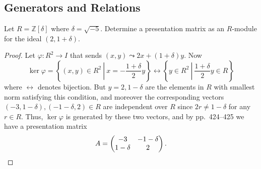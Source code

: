 \documentclass[12pt]{article}
\theoremstyle{remark}
\begin{document}
\subsection{Generators and Relations}
\begin{problem}
  Let $R = \mathbb{Z}[\delta]$ where $\delta = \sqrt{-5}$.  Determine a presentation matrix as an $R$-module for the ideal $(2, 1+\delta)$.
\end{problem}
\begin{proof}
  Let $\varphi\colon R^2\rightarrow I$ that sends $(x,y)\leadsto 2x+(1+\delta)y$. Now
  \begin{equation*}
    \ker\varphi = \left\{(x,y) \in R^2~\left\vert~x = -\frac{1+\delta}{2} y \right.\right\} \leftrightarrow \left\{y \in R^2~\left\vert~\frac{1+\delta}{2} y \in R \right.\right\}
  \end{equation*}
  where $\leftrightarrow$ denotes bijection. But $y = 2,1-\delta$ are the elements in $R$ with smallest norm satisfying this condition, and moreover the corresponding vectors $(-3,1-\delta),(-1-\delta,2) \in R$ are independent over $R$ since $2r \ne 1-\delta$ for any $r \in R$. Thus, $\ker\varphi$ is generated by these two vectors, and by pp.~424--425 we have a presentation matrix
  \begin{equation*}
    A = \begin{pmatrix}
      -3 & -1-\delta\\
      1-\delta & 2
    \end{pmatrix}.\qedhere
  \end{equation*}
\end{proof}

\setcounter{subsection}{6}
\end{document}
